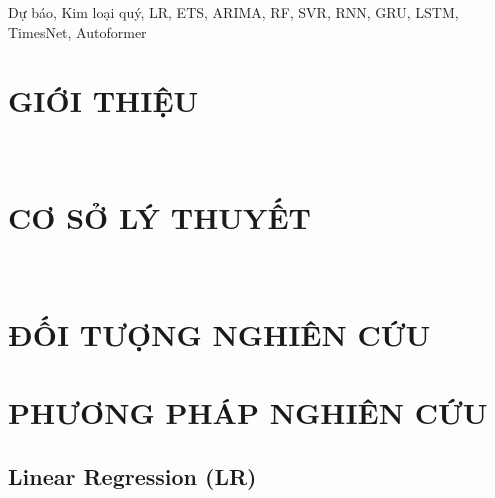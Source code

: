 \documentclass[conference]{IEEEtran}
\begin{document}
\maketitle
\thispagestyle{fancy}
\begin{abstract}

\end{abstract}

\begin{IEEEkeywords}
Dự báo, Kim loại quý, LR, ETS, ARIMA, RF, SVR, RNN, GRU, LSTM, TimesNet, Autoformer
\end{IEEEkeywords}

\section{\textbf{GIỚI THIỆU}}

\hfill\\

\section{\textbf{CƠ SỞ LÝ THUYẾT}}



















\hfill\\

\section{\textbf{ĐỐI TƯỢNG NGHIÊN CỨU}}


\section{\textbf{PHƯƠNG PHÁP NGHIÊN CỨU}}
\subsection{Linear Regression (LR)}

\end{document}
